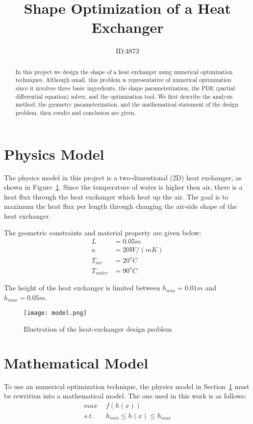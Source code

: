 \documentclass[a4paper]{article}
\title{Shape Optimization of a Heat Exchanger}
\author{ID:4873}
\begin{document}
 \maketitle
 
\begin{abstract}
   In this project we design the shape of a heat exchanger using numerical optimization techniques. Although small, this problem is representative of numerical optimization since it involves three basic ingredients, the shape parameterization, the PDE (partial differential equation) solver, and the optimization tool. We first describe the analysis method, the geometry parameterization, and the mathematical statement of the design problem, then results and conclusion are given.
\end{abstract}

\section{Physics Model} \label{sec:physics}
The physics model in this project is a two-dimentional (2D) heat exchanger, as shown in Figure~\ref*{fig:model}. Since the temperature of water is higher then air, there is a heat flux through the heat exchanger which heat up the air. The goal is to maximum the heat flux per length through changing the air-side shape of the heat exchanger.

The geometric constraints and material property are given below:
\begin{equation}
\begin{aligned}
  L &= 0.05m \\
  \kappa &= 20 W/(mK) \\
  T_{air} &= 20^o C \\
  T_{water} &= 90^o C
\end{aligned}
\end{equation}

The height of the heat exchanger is limited between $h_{min}=0.01m$ and $h_{max}=0.05m$.
\begin{figure} 
   \centering
   \texttt{[image: model.png]}
   \caption{Illustration of the heat-exchanger design problem}
   \label{fig:model}
\end{figure} 

\section{Mathematical Model}
To use an numerical optimization technique, the physics model in Section~\ref{sec:physics} must be rewritten into a mathematical model. The one used in this work is as follows:
\begin{equation} \label{eq:math_model_1}
\begin{aligned}
max\:\: &f(h(x)) \\
s.t.\:\: & h_{min} \le h(x) \le h_{max}
\end{aligned}
\end{equation}
\end{document}
